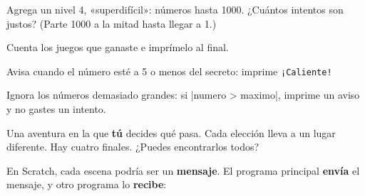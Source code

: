 \enlargethispage{\baselineskip}
\begin{challenge}\small
\tick Agrega un nivel 4, «superdifícil»: números hasta 1000. ¿Cuántos intentos son justos? (Parte 1000 a la mitad hasta llegar a 1.)\par
\tick Cuenta los juegos que ganaste e imprímelo al final.\par
\tick Avisa cuando el número esté a 5 o menos del secreto: imprime \texttt{¡Caliente!}\par
\tick Ignora los números demasiado grandes: si \py|numero > maximo|, imprime un aviso y no gastes un intento.
\end{challenge}


Una aventura en la que \textbf{tú} decides qué pasa. Cada elección lleva a un lugar diferente. Hay cuatro finales. ¿Puedes encontrarlos todos?

En Scratch, cada escena podría ser un \textbf{mensaje}. El programa principal \textbf{envía} el mensaje, y otro programa lo \textbf{recibe}:

\begin{center}
\begin{minipage}[t]{0.52\linewidth}
\begin{scratch}[scale=0.8]
\end{scratch}
\end{minipage}\hfill
\begin{minipage}[t]{0.44\linewidth}
\begin{scratch}[scale=0.73]
\end{scratch}
\end{minipage}
\end{center}

